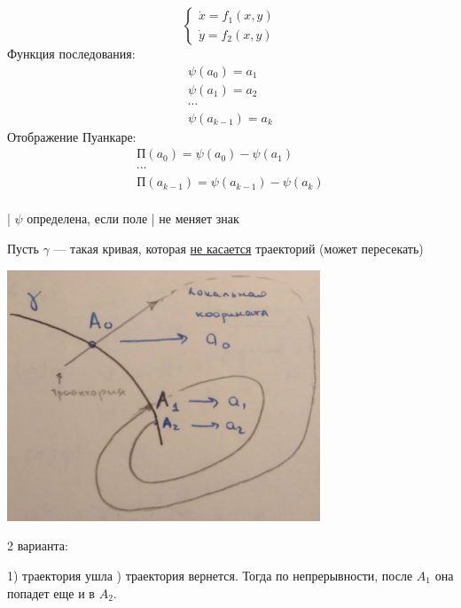 \documentclass[oneside, final, 12pt]{article}
\theoremstyle{def}
\theoremstyle{th}
\theoremstyle{rem}
\numberwithin{figure}{section}
\numberwithin{equation}{section}
\begin{document}
	\begin{minipage}{0.4\textwidth}	
		$$
			\begin{cases}
	 			\dot{x} = f_1(x,y) \\
	 			\dot{y} = f_2(x,y)
			\end{cases} 
		$$
		Функция последования:
		$$
			\begin{gathered}
				\psi(a_0) = a_1 \\
				\psi(a_1) = a_2 \\ \cdots \\
				\psi(a_{k-1}) = a_k			
			\end{gathered}
		$$
		Отображение Пуанкаре:
		\newline
		$$
			\begin{gathered}
				\text{П} (a_0) = \psi(a_0) - \psi(a_1) \\ \cdots \\
				\text{П} (a_{k-1}) = \psi(a_{k-1}) - \psi(a_k) \\ 	
			\end{gathered}
		$$ 
	
	    \begin{center}
				\Big| $\psi$ определена, если поле \Big| \newline не меняет знак
		\end{center}
	\end{minipage}
	\hfill
	\begin{minipage}{0.6\textwidth}
		Пусть $\gamma$ --- такая кривая, которая \newline 
		\underline{не касается} траекторий (может пересекать)	
		\begin{center} \includegraphics[width=0.7\textwidth]{pict/pict_1.png} \end{center} 
				\begin{center}2 варианта: \end{center}  
				1) траектория ушла ) траектория вернется. Тогда по непрерывности, \newline 
					после $A_1$ она попадет еще и в $A_2$.
	\end{minipage} \newline
\end{document}
